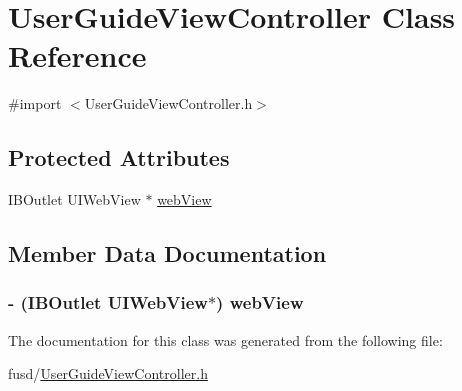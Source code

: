 \hypertarget{interface_user_guide_view_controller}{
\section{\-User\-Guide\-View\-Controller \-Class \-Reference}
\label{interface_user_guide_view_controller}
}


{\ttfamily \#import $<$\-User\-Guide\-View\-Controller.\-h$>$}

\subsection*{\-Protected \-Attributes}
\begin{DoxyCompactItemize}
\item 
\-I\-B\-Outlet \-U\-I\-Web\-View $\ast$ \hyperlink{interface_user_guide_view_controller_aceece2b1b416ead0eeab802ebd70acd6}{web\-View}
\end{DoxyCompactItemize}


\subsection{\-Member \-Data \-Documentation}
\hypertarget{interface_user_guide_view_controller_aceece2b1b416ead0eeab802ebd70acd6}{
\subsubsection[{web\-View}]{\setlength{\rightskip}{0pt plus 5cm}-\/ (\-I\-B\-Outlet \-U\-I\-Web\-View$\ast$) {\bf web\-View}}}
\label{interface_user_guide_view_controller_aceece2b1b416ead0eeab802ebd70acd6}


\-The documentation for this class was generated from the following file\-:\begin{DoxyCompactItemize}
\item 
fusd/\hyperlink{_user_guide_view_controller_8h}{\-User\-Guide\-View\-Controller.\-h}\end{DoxyCompactItemize}
